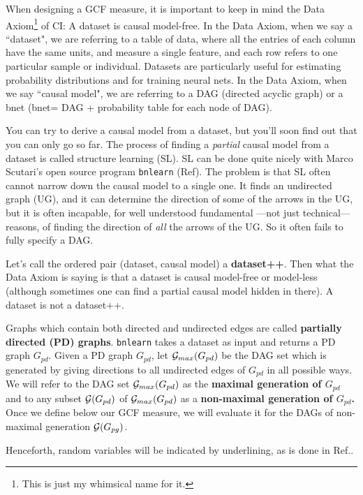 \documentclass[12pt]{article}
\begin{document}
When designing a GCF measure,
it is important to keep
in mind the Data Axiom\footnote{
This is just my whimsical name for it.} of CI: A dataset is causal model-free.
 In the Data Axiom,
when we say a ``dataset", we are referring to  a table of data, where all
 the entries of each column have the same units, and 
measure a single feature, and each row refers to one
 particular sample or individual. Datasets are particularly 
useful for estimating probability distributions and for 
training neural nets. In the Data Axiom, when we say ``causal model", we are 
referring to a DAG (directed acyclic graph) or a bnet
 (bnet= DAG + probability table 
for each node of DAG).

You can try to derive a causal model from a dataset, 
but you'll soon find out that you can only go so far.
The process of finding a {\it partial} causal model from a dataset 
is called structure learning (SL).  SL can be done quite
 nicely with Marco Scutari's open source program 
{\tt bnlearn} (Ref\cite{bnlearn}).
The problem is that SL often cannot 
narrow down the causal model to a single one. It finds an undirected graph (UG), 
and it can determine the direction of some of the arrows in the UG, 
but it is often incapable, for well understood 
fundamental ---not just technical--- reasons,
 of finding the direction of {\it all}  the arrows of the UG. 
So it often fails to fully specify a DAG.

Let's call the ordered pair (dataset, causal model) a 
{\bf dataset++}.
 Then what the Data Axiom is saying is that a dataset 
is causal model-free or model-less (although sometimes one can 
find a partial causal model hidden in there). 
A dataset is not a dataset++.

Graphs
which contain both directed 
and undirected edges
are called 
{\bf partially directed (PD) graphs}.
{\tt bnlearn} takes
a dataset as input
and returns a PD graph
$G_{pd}$.
Given a PD graph $G_{pd}$,
let ${\cal G}_{max}(G_{pd})$
be the DAG set 
which 
is generated
by giving directions to all 
undirected edges of $G_{pd}$
in all possible ways.
We will refer to the
DAG set
 ${\cal G}_{max}(G_{pd})$ as the
 {\bf maximal generation of $G_{pd}$}
and to any subset ${\cal G}(G_{pd})$ of
${\cal G}_{max}(G_{pd})$ as a {\bf non-maximal 
generation of $G_{pd}$.}
Once we define below our
 GCF measure,
we will evaluate it for the DAGs of 
non-maximal generation ${\cal G}(G_{pg})$.




Henceforth, random variables
will be indicated by underlining,
as is done in Ref.\cite{bayesuvius}.
\end{document}
